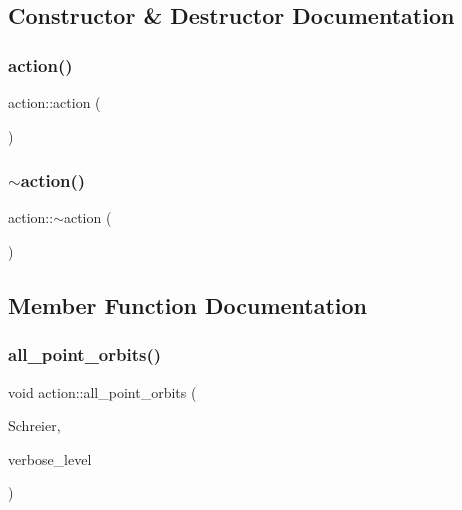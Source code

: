 \subsection{Constructor \& Destructor Documentation}
\mbox{\label{classaction_a108adb38ad362aeb55cf40b9de38bb16}} 
\subsubsection{\texorpdfstring{action()}{action()}}
{\footnotesize\ttfamily action\+::action (\begin{DoxyParamCaption}{ }\end{DoxyParamCaption})}

\mbox{\label{classaction_ab6f76ca0e49cfd012d51036f32e86116}} 
\subsubsection{\texorpdfstring{$\sim$action()}{~action()}}
{\footnotesize\ttfamily action\+::$\sim$action (\begin{DoxyParamCaption}{ }\end{DoxyParamCaption})}



\subsection{Member Function Documentation}
\mbox{\label{classaction_a69c5d635fef1124cf0a1b4cd5e879262}} 
\subsubsection{\texorpdfstring{all\+\_\+point\+\_\+orbits()}{all\_point\_orbits()}}
{\footnotesize\ttfamily void action\+::all\+\_\+point\+\_\+orbits (\begin{DoxyParamCaption}\item[{\mbox{\hyperlink{classschreier}{schreier}} \&}]{Schreier,  }\item[{\mbox{\hyperlink{galois_8h_a09fddde158a3a20bd2dcadb609de11dc}{I\+NT}}}]{verbose\+\_\+level }\end{DoxyParamCaption})}

